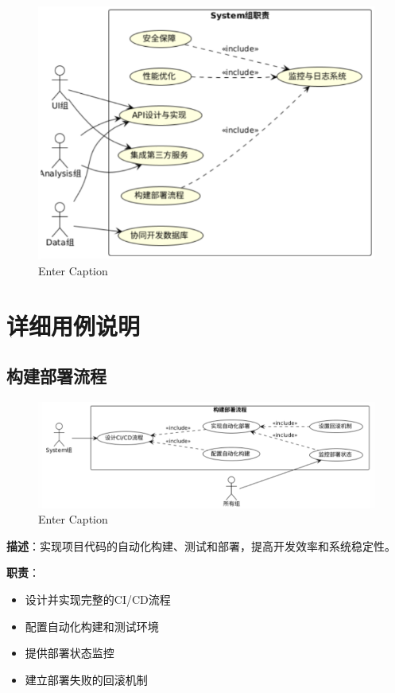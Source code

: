 \documentclass[a4paper,12pt]{article}
\begin{document}
\begin{figure}[H]
    \centering
    \includegraphics[width=0.75\linewidth]{assets/image2.png}
    \caption{Enter Caption}
    \label{fig:enter-label}
\end{figure}

\section{详细用例说明}

\subsection{构建部署流程}

\begin{figure}[H]
    \centering
    \includegraphics[width=0.75\linewidth]{assets/image1.png}
    \caption{Enter Caption}
    \label{fig:enter-label}
\end{figure}

\textbf{描述}：实现项目代码的自动化构建、测试和部署，提高开发效率和系统稳定性。

\textbf{职责}：
\begin{itemize}
  \item 设计并实现完整的CI/CD流程
  \item 配置自动化构建和测试环境
  \item 提供部署状态监控
  \item 建立部署失败的回滚机制
\end{itemize}
\end{document}
